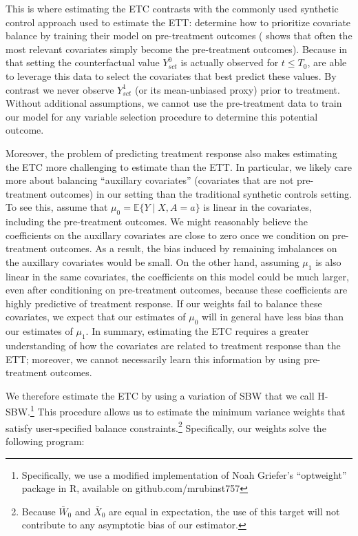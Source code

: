 \documentclass[aoas]{imsart}
\theoremstyle{plain}
\theoremstyle{remark}
\begin{document}
This is where estimating the ETC contrasts with the commonly used synthetic control approach used to estimate the ETT: \cite{abadie2010synthetic} determine how to prioritize covariate balance by training their model on pre-treatment outcomes (\cite{kaul2015synthetic} shows that often the most relevant covariates simply become the pre-treatment outcomes). Because in that setting the counterfactual value $Y^0_{sct}$ is actually observed for $t \le T_0$, \cite{abadie2010synthetic} are able to leverage this data to select the covariates that best predict these values. By contrast we never observe $Y^1_{sct}$ (or its mean-unbiased proxy) prior to treatment. Without additional assumptions, we cannot use the pre-treatment data to train our model for any variable selection procedure to determine this potential outcome.

Moreover, the problem of predicting treatment response also makes estimating the ETC more challenging to estimate than the ETT. In particular, we likely care more about balancing ``auxillary covariates'' (covariates that are not pre-treatment outcomes) in our setting than the traditional synthetic controls setting. To see this, assume that $\mu_0 = \mathbb{E}\{Y \mid X, A = a\}$ is linear in the covariates, including the pre-treatment outcomes. We might reasonably believe the coefficients on the auxillary covariates are close to zero once we condition on pre-treatment outcomes. As a result, the bias induced by remaining imbalances on the auxillary covariates would be small. On the other hand, assuming $\mu_1$ is also linear in the same covariates, the coefficients on this model could be much larger, even after conditioning on pre-treatment outcomes, because these coefficients are highly predictive of treatment response. If our weights fail to balance these covariates, we expect that our estimates of $\mu_0$ will in general have less bias than our estimates of $\mu_1$. In summary, estimating the ETC requires a greater understanding of how the covariates are related to treatment response than the ETT; moreover, we cannot necessarily learn this information by using pre-treatment outcomes.

We therefore estimate the ETC by using a variation of SBW that we call H-SBW.\footnote{Specifically, we use a modified implementation of Noah Griefer's ``optweight'' package in R, available on github.com/mrubinst757} This procedure allows us to estimate the minimum variance weights that satisfy user-specified balance constraints.\footnote{Because $\bar{W}_0$ and $\bar{X}_0$ are equal in expectation, the use of this target will not contribute to any asymptotic bias of our estimator.} Specifically, our weights solve the following program:
\end{document}
